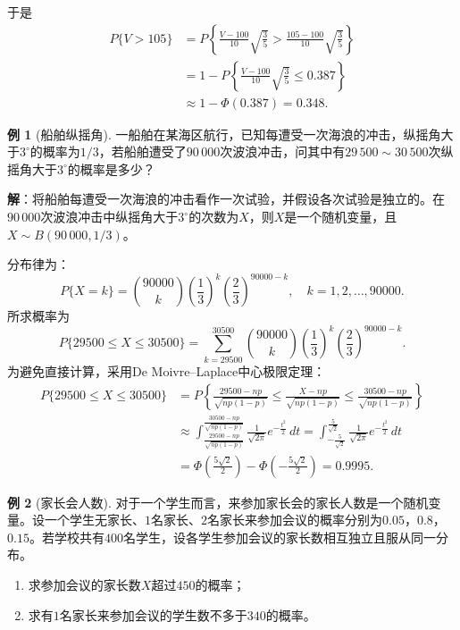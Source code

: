 \documentclass[11pt,a4paper]{report}
\theoremstyle{definition}
\newtheorem{example}{例}[chapter]
\begin{document}
于是
\begin{align*}
P\{V>105\}&=P\left\{\frac{V-100}{10}\sqrt{\frac{3}{5}}>\frac{105-100}{10}\sqrt{\frac{3}{5}}\right\}\\
&=1-P\left\{\frac{V-100}{10}\sqrt{\frac{3}{5}}\leq0.387\right\}\\
&\approx1-\Phi(0.387)=0.348.
\end{align*}

\begin{example}[船舶纵摇角]
一船舶在某海区航行，已知每遭受一次海浪的冲击，纵摇角大于$3^{\circ}$的概率为$1/3$，若船舶遭受了$90\,000$次波浪冲击，问其中有$29\,500\sim30\,500$次纵摇角大于$3^{\circ}$的概率是多少？
\end{example}

\textbf{解}：将船舶每遭受一次海浪的冲击看作一次试验，并假设各次试验是独立的。在$90\,000$次波浪冲击中纵摇角大于$3^{\circ}$的次数为$X$，则$X$是一个随机变量，且$X\sim B(90\,000,1/3)$。

分布律为：
\[
P\{X=k\}=\binom{90000}{k}\left(\frac{1}{3}\right)^{k}\left(\frac{2}{3}\right)^{90000-k},\quad k=1,2,\ldots,90000.
\]
所求概率为
\[
P\{29500\leq X\leq30500\}=\sum_{k=29500}^{30500}\binom{90000}{k}\left(\frac{1}{3}\right)^{k}\left(\frac{2}{3}\right)^{90000-k}.
\]
为避免直接计算，采用De Moivre--Laplace中心极限定理：
\begin{align*}
P\{29500\leq X\leq30500\}&=P\left\{\frac{29500-np}{\sqrt{np(1-p)}}\leq\frac{X-np}{\sqrt{np(1-p)}}\leq\frac{30500-np}{\sqrt{np(1-p)}}\right\}\\
&\approx\int_{\frac{29500-np}{\sqrt{np(1-p)}}}^{\frac{30500-np}{\sqrt{np(1-p)}}}\frac{1}{\sqrt{2\pi}}e^{-\frac{t^{2}}{2}}\,dt
=\int_{-\frac{5}{\sqrt{2}}}^{\frac{5}{\sqrt{2}}}\frac{1}{\sqrt{2\pi}}e^{-\frac{t^{2}}{2}}\,dt\\
&=\Phi\left(\frac{5\sqrt{2}}{2}\right)-\Phi\left(-\frac{5\sqrt{2}}{2}\right)=0.9995.
\end{align*}

\begin{example}[家长会人数]
对于一个学生而言，来参加家长会的家长人数是一个随机变量。设一个学生无家长、$1$名家长、$2$名家长来参加会议的概率分别为$0.05$，$0.8$，$0.15$。若学校共有$400$名学生，设各学生参加会议的家长数相互独立且服从同一分布。
\begin{enumerate}[label=(\arabic*),leftmargin=2em]
    \item 求参加会议的家长数$X$超过$450$的概率；
    \item 求有$1$名家长来参加会议的学生数不多于$340$的概率。
\end{enumerate}
\end{example}
\end{document}
